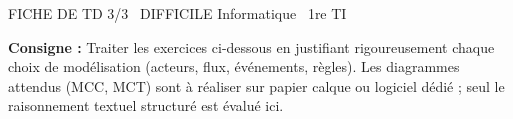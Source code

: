\documentclass[11pt]{article}
\begin{document}
\begin{tcolorbox}[enhanced,colback=popink,colframe=popink,arc=10pt,boxrule=0pt,left=12pt,right=12pt,top=9pt,bottom=9pt]
{\color{white}\popxbold\small FICHE DE TD 3/3 \textbullet\ DIFFICILE \hfill Informatique \textbullet\ 1re TI\par}
\end{tcolorbox}
\vspace{4pt}
\noindent \textbf{Consigne :} Traiter les exercices ci-dessous en justifiant rigoureusement chaque choix de modélisation (acteurs, flux, événements, règles). Les diagrammes attendus (MCC, MCT) sont à réaliser sur papier calque ou logiciel dédié ; seul le raisonnement textuel structuré est évalué ici.
\end{document}
